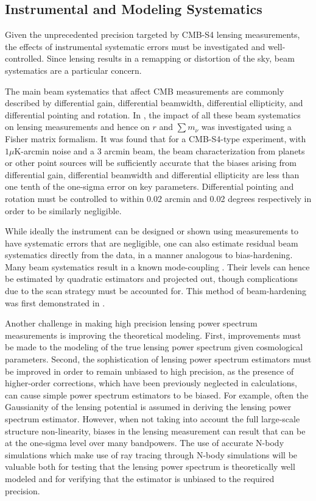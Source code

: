 \subsection{Instrumental and Modeling Systematics}\label{systInst}
 	
Given the unprecedented precision targeted by CMB-S4 lensing measurements, the effects of instrumental systematic errors must be investigated and well-controlled. Since lensing results in a remapping or distortion of the sky, beam systematics are a particular concern. 

The main beam systematics that affect CMB measurements are commonly described by differential gain, differential beamwidth, differential ellipticity, and differential pointing and rotation. In \cite{Smith:2008an}, the impact of all these beam systematics on lensing measurements and hence on $r$ and $\sum m_\nu$ was investigated using a Fisher matrix formalism. It was found that for a CMB-S4-type experiment, with $1 \mu $K-arcmin noise and a 3 arcmin beam, the beam characterization from planets or other point sources will be sufficiently accurate that the biases arising from differential gain, differential beamwidth and differential ellipticity are less than one tenth of the one-sigma error on key parameters. Differential pointing and rotation must be controlled to within 0.02 arcmin and 0.02 degrees respectively in order to be similarly negligible.

While ideally the instrument can be designed or shown using measurements to have systematic errors that are negligible, one can also estimate residual beam systematics directly from the data, in a manner analogous to bias-hardening. Many beam systematics result in a known mode-coupling \cite{Yadav:2009eb}.  Their levels can hence be estimated by quadratic estimators and projected out, though complications due to the scan strategy must be accounted for. This method of beam-hardening was first demonstrated in \cite{Ade:2013tyw}.

Another challenge in making high precision lensing power spectrum measurements is improving the theoretical modeling. First, improvements must be made to the modeling of the true lensing power spectrum given cosmological parameters. Second, the sophistication of lensing power spectrum estimators must be improved in order to remain unbiased to high precision, as the presence of higher-order corrections, which have been previously neglected in calculations, can cause simple power spectrum estimators to be biased. For example, often the Gaussianity of the lensing potential is assumed in deriving the lensing power spectrum estimator.  However, when not taking into account the full large-scale structure non-linearity, biases in the lensing measurement can result that can be at the one-sigma level over many bandpowers.  The use of accurate N-body simulations which make use of ray tracing through N-body simulations \cite{Calabrese:2014gla} will be valuable both for testing that the lensing power spectrum is theoretically well modeled and for verifying that the estimator is unbiased to the required precision.

